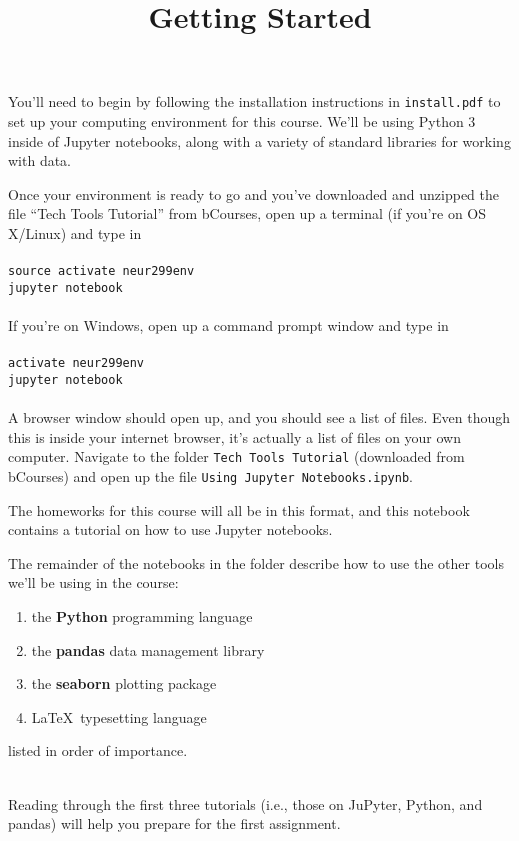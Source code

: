 \documentclass[twoside]{article}
\title{Getting Started}
\date{}
\author{}
\begin{document}
\maketitle

You'll need to begin by following the installation instructions in
\texttt{install.pdf}
to set up your computing environment for this course.
We'll be using Python 3 inside of Jupyter notebooks,
along with a variety of standard libraries for working with data.

Once your environment is ready to go
and you've downloaded and unzipped
the file ``Tech Tools Tutorial'' from bCourses,
open up a terminal (if you're on OS X/Linux)
and type in
\\ \\
\texttt{source activate neur299env}
\\
\texttt{jupyter notebook}
\\ \\
If you're on Windows, open up a
command prompt window
and type in
\\ \\
\texttt{activate neur299env}
\\
\texttt{jupyter notebook}
\\ \\
A browser window should open up, and you should see a list of files.
Even though this is inside your internet browser,
it's actually a list of files on your own computer.
Navigate to the folder \texttt{Tech Tools Tutorial}
(downloaded from bCourses)
and open up the file
\texttt{Using Jupyter Notebooks.ipynb}.

The homeworks for this course will all be in this format,
and this notebook contains a tutorial on how to use Jupyter notebooks.

The remainder of the notebooks in the folder describe how
to use the other tools we'll be using in the course:

\begin{enumerate}
\item the \textbf{Python} programming language
\item the \textbf{pandas} data management library
\item the \textbf{seaborn} plotting package
\item \LaTeX \ typesetting language
\end{enumerate}

listed in order of importance.

\ \\

Reading through the first three tutorials
(i.e., those on JuPyter, Python, and pandas)
will help you prepare for the first assignment.
\end{document}
